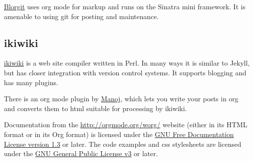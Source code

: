 \documentclass{article}
\begin{document}
\href{http://orgmode.org/worg/blorgit.html}{Blorgit} uses org mode for
markup and runs on the Sinatra mini framework. It is amenable to using
git for posting and maintenance.
\subsection{ikiwiki}
\label{sec-12-2}


\href{http://ikiwiki.info/}{ikiwiki} is a web site compiler written in
Perl. In many ways it is similar to Jekyll, but has closer integration
with version control systems. It supports blogging and has many plugins.

There is an org mode plugin by
\href{http://www.golden-gryphon.com/blog/manoj/blog/2008/06/08/Using_org-mode_with_Ikiwiki/}{Manoj},
which lets you write your posts in org and converts them to html
suitable for processing by ikiwiki.

Documentation from the \href{http://orgmode.org/worg/}{http://orgmode.org/worg/} website (either in its
HTML format or in its Org format) is licensed under the
\href{http://www.gnu.org/copyleft/fdl.html}{GNU Free Documentation License version 1.3} or later. The code examples and css stylesheets are
licensed under the \href{http://www.gnu.org/licenses/gpl.html}{GNU General Public License v3} or later.
\end{document}

